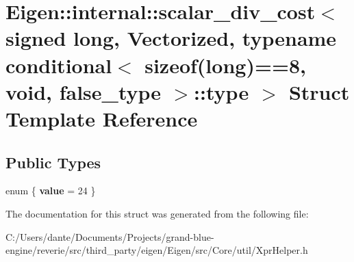 \hypertarget{struct_eigen_1_1internal_1_1scalar__div__cost_3_01signed_01long_00_01_vectorized_00_01typename_0928d7226c6d88e74072f0f5e87ecaa67}{}\section{Eigen\+::internal\+::scalar\+\_\+div\+\_\+cost$<$ signed long, Vectorized, typename conditional$<$ sizeof(long)==8, void, false\+\_\+type $>$\+::type $>$ Struct Template Reference}
\label{struct_eigen_1_1internal_1_1scalar__div__cost_3_01signed_01long_00_01_vectorized_00_01typename_0928d7226c6d88e74072f0f5e87ecaa67}
\subsection*{Public Types}
\begin{DoxyCompactItemize}
\item 
\mbox{\label{struct_eigen_1_1internal_1_1scalar__div__cost_3_01signed_01long_00_01_vectorized_00_01typename_0928d7226c6d88e74072f0f5e87ecaa67_a29281f90dafa52956863475f43dba5b9}} 
enum \{ {\bfseries value} = 24
 \}
\end{DoxyCompactItemize}


The documentation for this struct was generated from the following file\+:\begin{DoxyCompactItemize}
\item 
C\+:/\+Users/dante/\+Documents/\+Projects/grand-\/blue-\/engine/reverie/src/third\+\_\+party/eigen/\+Eigen/src/\+Core/util/Xpr\+Helper.\+h\end{DoxyCompactItemize}
